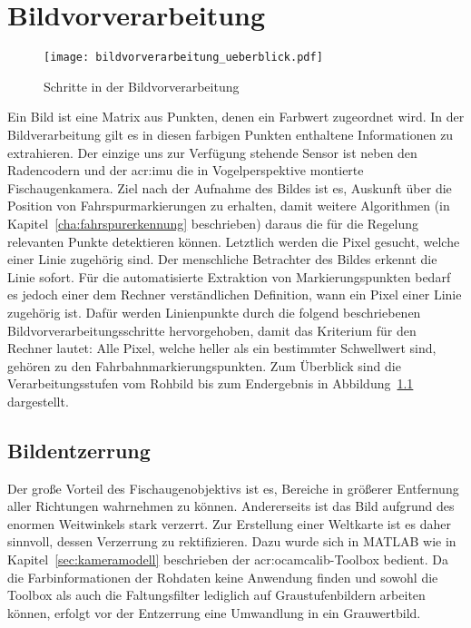 \chapter{Bildvorverarbeitung \dcfirstauthorshort}
\label{cha:bildvorverarbeitung}

\begin{figure}[htbp] %
	\centering
	\texttt{[image: bildvorverarbeitung\_ueberblick.pdf]}
	\caption{Schritte in der Bildvorverarbeitung}
	\label{fig:bildvorverarbeitung_ueberblick}
\end{figure} 

Ein Bild ist eine Matrix aus Punkten, denen ein Farbwert zugeordnet wird. In der Bildverarbeitung gilt es in diesen farbigen Punkten enthaltene Informationen zu extrahieren. Der einzige uns zur Verfügung stehende Sensor ist neben den Radencodern und der \gls{acr:imu} die in Vogelperspektive montierte Fischaugenkamera. Ziel nach der Aufnahme des Bildes ist es, Auskunft über die Position von Fahrspurmarkierungen zu erhalten, damit weitere Algorithmen (in Kapitel~\ref{cha:fahrspurerkennung} beschrieben) daraus die für die Regelung relevanten Punkte detektieren können. Letztlich werden die Pixel gesucht, welche einer Linie zugehörig sind. Der menschliche Betrachter des Bildes erkennt die Linie sofort. Für die automatisierte Extraktion von Markierungspunkten bedarf es jedoch einer dem Rechner verständlichen Definition, wann ein Pixel einer Linie zugehörig ist. Dafür werden Linienpunkte durch die folgend beschriebenen Bildvorverarbeitungsschritte hervorgehoben, damit das Kriterium für den Rechner lautet: Alle Pixel, welche heller als ein bestimmter Schwellwert sind, gehören zu den Fahrbahnmarkierungspunkten. Zum Überblick sind die Verarbeitungsstufen vom Rohbild bis zum Endergebnis in Abbildung~\ref{fig:bildvorverarbeitung_ueberblick} dargestellt.

\section{Bildentzerrung \dcfirstauthorshort}

Der große Vorteil des Fischaugenobjektivs ist es, Bereiche in größerer Entfernung aller Richtungen wahrnehmen zu können. Andererseits ist das Bild aufgrund des enormen Weitwinkels stark verzerrt. Zur Erstellung einer Weltkarte ist es daher sinnvoll, dessen Verzerrung zu rektifizieren. Dazu wurde sich in MATLAB wie in Kapitel~\ref{sec:kameramodell} beschrieben der \gls{acr:ocamcalib}-Toolbox bedient. Da die Farbinformationen der Rohdaten keine Anwendung finden und sowohl die Toolbox als auch die Faltungsfilter lediglich auf Graustufenbildern arbeiten können, erfolgt vor der Entzerrung eine Umwandlung in ein Grauwertbild.

